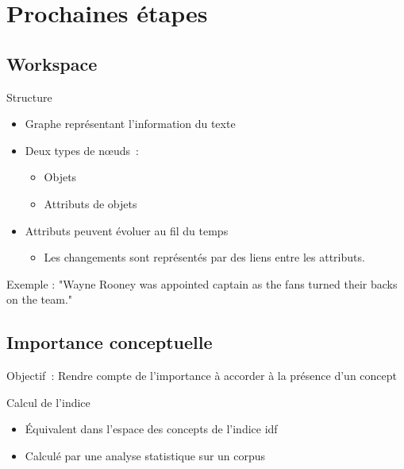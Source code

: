 \documentclass[12pt]{beamer}
\begin{document}
\section{Prochaines étapes}

\subsection{Workspace}
\begin{frame}
  \begin{block}{Structure}
  \begin{itemize}
    \item Graphe représentant l'information du texte
    \item Deux types de nœuds~:
      \begin{itemize}
        \item Objets
        \item Attributs de objets
      \end{itemize}
    \item Attributs peuvent évoluer au fil du temps
    \begin{itemize}
    	\item Les changements sont représentés par des liens entre les attributs.
    \end{itemize}
  \end{itemize}
  
  Exemple : "Wayne Rooney was appointed captain as the fans turned their backs on the team."
  \end{block}
\end{frame}

\subsection{Importance conceptuelle}
\begin{frame}
  \begin{block}{Objectif~:}
    Rendre compte de l'importance à accorder à la présence d'un concept
  \end{block}

  \begin{block}{Calcul de l'indice}
    \begin{itemize}
      \item Équivalent dans l'espace des concepts de l'indice idf
      \item Calculé par une analyse statistique sur un corpus
    \end{itemize}
  \end{block}
\end{frame}
\end{document}
